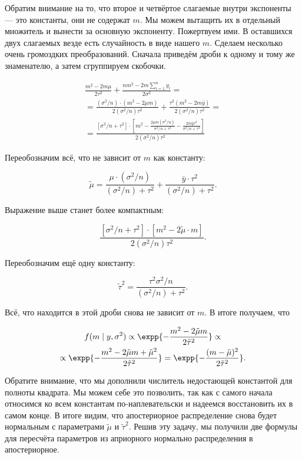 \begin{problem}
\begin{sol}
Обратим внимание на то, что второе и четвёртое слагаемые внутри экспоненты --- это константы, они не содержат $m$. Мы можем вытащить их в отдельный множитель и вынести за основную экспоненту. Пожертвуем ими. В оставшихся двух слагаемых везде есть случайность в виде нашего $m$. Сделаем несколько очень громоздких преобразований. Сначала приведём дроби к одному и тому же знаменателю, а затем сгруппируем скобочки.

\begin{multline*}
\frac{m^2 - 2m \mu}{2 \tau^2} + \frac{n m^2 - 2m \sum_{i=1}^n y_i}{2\sigma^2} = \\ = \frac{(\sigma^2/n) \cdot (m^2 - 2 \mu m)}{2 (\sigma^2/n) \tau^2} + \frac{\tau^2(m^2 - 2m \bar y)}{2 (\sigma^2/n) \tau^2} = \\ =  \frac{ [\sigma^2/n + \tau^2] \cdot \left[ m^2 - \frac{2\mu m(\sigma^2/n)}{\sigma^2/n+\tau^2} - \frac{2m\bar y \tau^2}{\sigma^2/n + \tau^2} \right]}{2 (\sigma^2/n) \tau^2}
\end{multline*}

Переобозначим всё, что не зависит от $m$ как константу:

\[\tilde \mu = \frac{\mu \cdot (\sigma^2/n)}{(\sigma^2/n) + \tau^2} + \frac{\bar y \cdot \tau^2}{(\sigma^2/n) + \tau^2}.\] 

Выражение выше станет более компактным:

\[ \frac{[\sigma^2/n + \tau^2] \cdot [m^2 - 2\tilde \mu \cdot m]}{2 (\sigma^2/n)\tau^2}.\]

Переобозначим ещё одну константу:


\[ \tilde \tau^2 = \frac{\tau^2 \sigma^2/n}{(\sigma^2/n) + \tau^2}.\]
 
 Всё, что находится в этой дроби снова не зависит от $m$. В итоге получаем, что

\begin{multline*} 
f(m \mid y, \sigma^2) \propto \expp{-\frac{m^2 - 2 \tilde \mu m}{2 \tilde \tau^2}} \propto  \\ \propto \expp{-\frac{m^2 - 2 \tilde \mu m + \tilde \mu^2}{2 \tilde \tau^2}} = \expp{-\frac{(m - \tilde \mu)^2}{2 \tilde \tau^2}}.
\end{multline*}

Обратите внимание, что мы дополнили числитель недостающей константой для полноты квадрата.  Мы можем себе это позволить, так как с самого начала относимся ко всем константам по-наплевательски и надеемся восстановить их в самом конце.  В итоге видим, что апостериорное распределение снова будет нормальным с параметрами $\tilde \mu$ и $\tilde \tau^2$. Решив эту задачу, мы получили две формулы для пересчёта параметров из априорного нормально распределения в апостериорное. 
\end{sol}
\end{problem}

